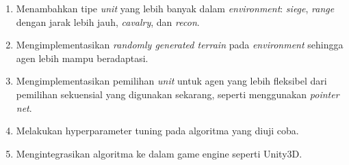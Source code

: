 \begin{enumerate}[nolistsep]

  \item Menambahkan tipe \emph{unit} yang lebih banyak dalam \emph{environment}: \emph{siege}, \emph{range}
  dengan jarak lebih jauh, \emph{cavalry}, dan \emph{recon}.

  \item Mengimplementasikan \emph{randomly generated terrain} pada \emph{environment} sehingga agen lebih
  mampu beradaptasi.

  \item Mengimplementasikan pemilihan \emph{unit} untuk agen yang lebih fleksibel dari pemilihan sekuensial
  yang digunakan sekarang, seperti menggunakan \emph{pointer net}.

  \item Melakukan hyperparameter tuning pada algoritma yang diuji coba.
  
  \item Mengintegrasikan algoritma ke dalam game engine seperti Unity3D.

\end{enumerate}
